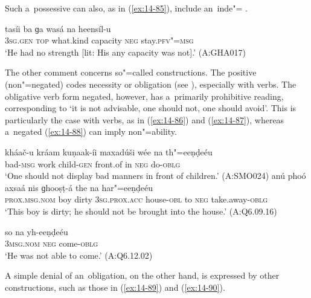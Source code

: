 Such a~possessive  can also, as in (\ref{ex:14-85}), include an~inde"= .

\begin{exe}
\ex
\label{ex:14-85}
\gll tasíi ba ɡa wasá na heensíl-u \\
\textsc{3sg.gen} \textsc{top} what.kind capacity \textsc{neg} stay.\textsc{pfv"=msg } \\
\glt `He had no strength [lit: His any capacity was not].' (A:GHA017)
\end{exe}

The other comment concerns so"=called  constructions. The positive (non"=negated)  codes necessity or obligation (see ), especially with  verbs. The obligative verb form negated, however, has a~primarily prohibitive reading, corresponding to `it is not advisable, one should not, one should avoid'. This is particularly the case with  verbs, as in (\ref{ex:14-86}) and (\ref{ex:14-87}), whereas a~negated   (\ref{ex:14-88}) can imply non"=ability.

\ea
\label{ex:14-86}
\gll kháač-u kráam kuṇaak-íi maxadúši wée na  th"=eeṇḍeéu \\
bad-\textsc{msg} work child-\textsc{gen} front.of in \textsc{neg} do-\textsc{oblg } \\
\glt `One should not display bad manners in front of children.' (A:SMO024) 
\ex
\label{ex:14-87}
\gll anú phoó axsaá nis ɡhooṣṭ-á the na har"=eeṇḍeéu\\
\textsc{prox.msg.nom} boy dirty \textsc{3sg.prox.acc} house-\textsc{obl} to \textsc{neg} take.away-\textsc{oblg}\\
\glt `This boy is dirty; he should not be brought into the house.' (A:Q6.09.16)

\ex
\label{ex:14-88}
\gll so na yh-eeṇḍeéu\\
\textsc{3msg}.\textsc{nom} \textsc{neg} come-\textsc{oblg}\\
\glt `He was not able to come.' (A:Q6.12.02)
\z

A simple denial of an~obligation, on the other hand, is expressed by other constructions, such as those in (\ref{ex:14-89}) and (\ref{ex:14-90}).

